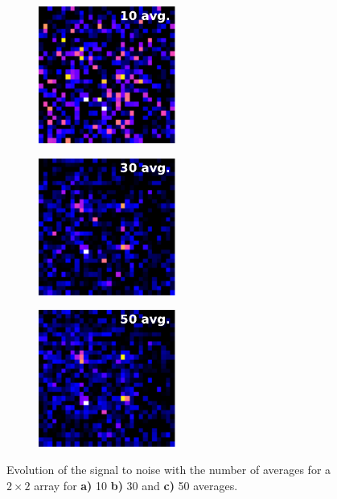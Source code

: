 \begin{figure}
    \centering
	\begin{subfigure}{.31\linewidth}
		\centering
		\includegraphics[height=4.5cm]{figures/10avg.pdf}
		\caption{}
		\label{fig:10avg}
	\end{subfigure}
	\hfill
	\begin{subfigure}{.31\linewidth}
		\centering
		\includegraphics[height=4.5cm]{figures/30avg.pdf}
		\caption{}
		\label{fig:30avg}
	\end{subfigure}
	\hfill
	\begin{subfigure}{.33\linewidth}
		\centering
		\includegraphics[height=4.5cm]{figures/50avg.pdf}
		\caption{}
		\label{fig:50avg}
	\end{subfigure}
	\caption{Evolution of the signal to noise with the number of averages for a $2\times 2$ array for \textsf{\textbf{a)}} 10 \textsf{\textbf{b)}} 30 and \textsf{\textbf{c)}} 50 averages.
    }
    \label{fig:Averaging}
\end{figure}





